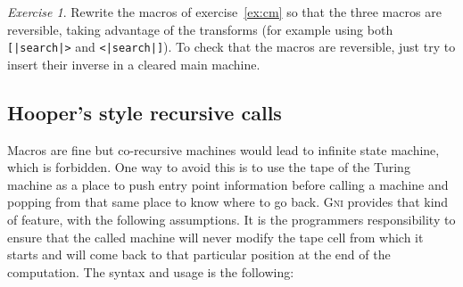 \documentclass[a4paper,11pt]{article}
\theoremstyle{remark}
\newtheorem{exercise}{Exercise}
\begin{document}
\begin{exercise}
Rewrite the macros of exercise~\ref{ex:cm} so that the three macros are reversible, taking advantage
of the transforms (for example using both \texttt{[|search|>} and \texttt{<|search|]}). To check that
the macros are reversible, just try to insert their inverse in a cleared main machine.
\end{exercise}

\subsection{Hooper's style recursive calls}

Macros are fine but co-recursive machines would lead to infinite state machine, which is forbidden.
One way to avoid this is to use the tape of the Turing machine as a place to push entry point information
before calling a machine and popping from that same place to know where to go back. \textsc{Gni} provides
that kind of feature, with the following assumptions. It is the programmers responsibility to ensure
that the called machine will never modify the tape cell from which it starts and will come back to
that particular position at the end of the computation. The syntax and usage is the following:
\end{document}
